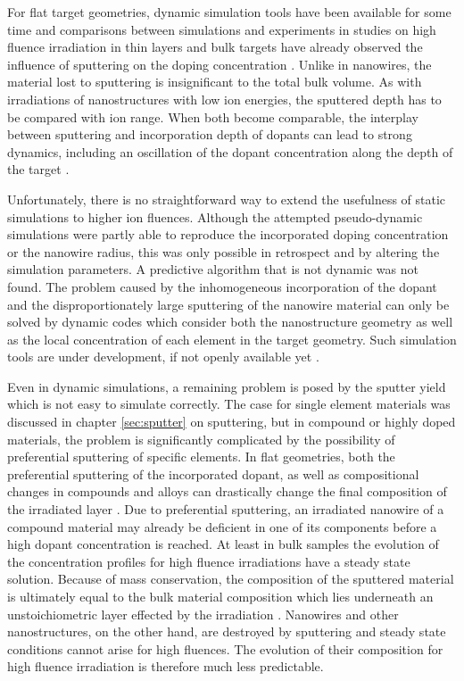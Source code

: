 For flat target geometries, dynamic simulation tools have been available for some time \cite{moller_tridyn_1984,moller_tridyn-binary_1988} and comparisons between simulations and experiments in studies on high fluence irradiation in thin layers and bulk targets have already observed the influence of sputtering on the doping concentration \cite{miyagawa_computer_1991,sigmund_alloy_1993}. Unlike in nanowires, the material lost to sputtering is insignificant to the total bulk volume. As with irradiations of nanostructures with low ion energies, the sputtered depth has to be compared with ion range. When both become comparable, the interplay between sputtering and incorporation depth of dopants can lead to strong dynamics, including an oscillation of the dopant concentration along the depth of the target \cite{eckstein_oscillations_2000}. 

Unfortunately, there is no straightforward way to extend the usefulness of static simulations to higher ion fluences. Although the attempted pseudo-dynamic simulations were partly able to reproduce the incorporated doping concentration or the nanowire radius, this was only possible in retrospect and by altering the simulation parameters. A predictive algorithm that is not dynamic was not found. The problem caused by the inhomogeneous incorporation of the dopant and the disproportionately large sputtering of the nanowire material can only be solved by dynamic codes which consider both the nanostructure geometry as well as the local concentration of each element in the target geometry. Such simulation tools are under development, if not openly available yet \cite{moller_tri3dyn_2014}.

Even in dynamic simulations, a remaining problem is posed by the sputter yield which is not easy to simulate correctly. The case for single element materials was discussed in chapter \ref{sec:sputter} on sputtering, but in compound or highly doped materials, the problem is significantly complicated by the possibility of preferential sputtering of specific elements. In flat geometries, both the preferential sputtering of the incorporated dopant, as well as compositional changes in compounds and alloys can drastically change the final composition of the irradiated layer \cite{kelly_attempt_1978,moller_tridyn_1984,andersen_computer_1986,moller_tridyn-binary_1988,sigmund_alloy_1993,zaporozchenko_preferential_1995}. Due to preferential sputtering, an irradiated nanowire of a compound material may already be deficient in one of its components before a high dopant concentration is reached. At least in bulk samples the evolution of the concentration profiles for high fluence irradiations have a steady state solution. Because of mass conservation, the composition of the sputtered material is ultimately equal to the bulk material composition which lies underneath an unstoichiometric layer effected by the irradiation \cite{andersen_computer_1986}. Nanowires and other nanostructures, on the other hand, are destroyed by sputtering and steady state conditions cannot arise for high fluences. The evolution of their composition for high fluence irradiation is therefore much less predictable.
